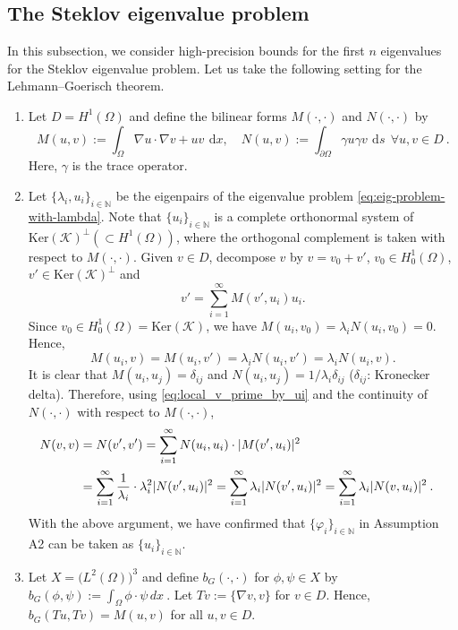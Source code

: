 \documentclass[a4,11pt]{article}
\numberwithin{equation}{section}
\newcommand{\ud}{\,\mbox{d}}
\begin{document}
\subsection{The Steklov eigenvalue problem}
\label{subsec:Lehmann--Goerisch-setting}
In this subsection, we consider high-precision bounds for the first $n$ eigenvalues for the Steklov eigenvalue problem.
%
Let us take the following setting for the Lehmann--Goerisch theorem.
\begin{enumerate}
\item [(a)] Let $D = H^1(\Omega)$ and define the bilinear forms
$M(\cdot, \cdot)$ and $N(\cdot, \cdot)$ by
\begin{equation*}
	M(u,v):= \int_\Omega \nabla u \cdot  \nabla v + uv \: \ud x,\quad
N(u,v) := \int_{\partial \Omega} \gamma u \gamma v \:\ud s~~ \forall u,v\in {D}~.
\end{equation*}
Here, $\gamma$ is the trace operator.


	\item [(b)] Let  $\{\lambda_i, u_i\}_{i \in \mathbb{N}}$  be the eigenpairs of the eigenvalue problem  \eqref{eq:eig-problem-with-lambda}. 
   Note that $\{u_i\}_{i \in \mathbb{N}}$ is a complete orthonormal system of $\mbox{Ker}(\mathcal{K})^\perp (\subset H^1(\Omega))$,   where the orthogonal complement is taken with respect to  $M(\cdot, \cdot)$. 
    Given $v\in  D$,  decompose $v$ by $v=v_0+v'$, $v_0 \in H_0^1(\Omega)$,
$v' \in \mbox{Ker}(\mathcal{K})^\perp$ and 
\begin{equation}
\label{eq:local_v_prime_by_ui}
v'=\sum_{i=1}^{\infty}  M(v',u_i) u_i.\end{equation}
%
Since $v_0 \in H_0^1(\Omega)=\mbox{Ker}(\mathcal{K})$, we have $ M(u_i, v_0)= \lambda_i N(u_i,v_0)=0$. 
Hence,
$$
 M(u_i, v) =
 M(u_i, v') =\lambda_i N(u_i, v')
 =\lambda_i N(u_i, v).
$$
%
It is clear that $M(u_i,u_j )=\delta_{ij}$ and $N(u_i,u_j )=1/\lambda_i\delta_{ij}$ ($\delta_{ij}$: Kronecker delta). 
Therefore,  using \eqref{eq:local_v_prime_by_ui} and the continuity of $N(\cdot, \cdot)$ with respect to $M(\cdot,\cdot)$,
\begin{align}
	N(v,v)  &= N(v',v') =  \sum_{i=1}^{\infty} N(u_i, u_i ) \cdot  |M(v',u_i)|^2 & \notag \\
&=\sum_{i=1}^\infty \frac{1}{\lambda_i} \cdot \lambda_i^2  |N(v',u_i)|^2 
=\sum_{i=1}^\infty \lambda_i  |N(v',u_i)|^2 = \sum_{i=1}^\infty \lambda_i  |N(v,u_i)|^2 \:.	&
\notag 
\end{align}
%
With the above argument,  we have confirmed that  $\{\varphi_i\}_{i \in \mathbb{N}}$ in Assumption A2 can be taken as $\{u_i\}_{i \in \mathbb{N}}$.


\item [(c)] Let ${X} = \big(L^2(\Omega)\big)^3$ and define $b_G(\cdot, \cdot)$ 
for	$\phi, \psi \in {X}$ by
$
b_G(\phi,\psi) := \int_\Omega \phi \cdot \psi \, dx \:.
$
Let $Tv := \{\nabla v,v\}$ for $v\in{D}$. Hence, $b_G(Tu,Tv)=M(u,v)$ for all $u,v\in {D}$.

\end{enumerate}
\end{document}

